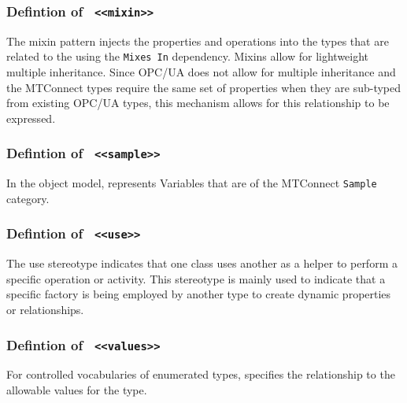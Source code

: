 \FloatBarrier
\subsubsection{Defintion of \texttt{ <<mixin>>}}
  \label{type:mixin}

\FloatBarrier

The mixin pattern injects the properties and operations into the types 
that are related to the using the \texttt{Mixes In} dependency. Mixins allow for
lightweight multiple inheritance. Since OPC/UA does not allow for multiple inheritance 
and the MTConnect  types require the same set of properties when they are sub-typed
from existing OPC/UA types, this mechanism allows for this relationship to be expressed.


\FloatBarrier
\subsubsection{Defintion of \texttt{ <<sample>>}}
  \label{type:sample}

\FloatBarrier

In the object model, represents Variables that are of the MTConnect \texttt{Sample} category.

\FloatBarrier
\subsubsection{Defintion of \texttt{ <<use>>}}
  \label{type:use}

\FloatBarrier

The use stereotype indicates that one class uses another as a helper to perform 
a specific operation or activity. This stereotype is mainly used to indicate
that a specific factory is being employed by another type to create dynamic
properties or relationships.

\FloatBarrier
\subsubsection{Defintion of \texttt{ <<values>>}}
  \label{type:values}

\FloatBarrier

For controlled vocabularies of enumerated types, specifies the relationship to the allowable 
values for the type.

\FloatBarrier
